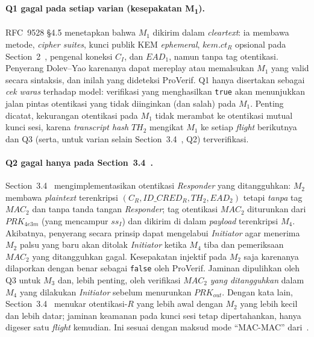 \documentclass{easychair}
\newcommand{\VarSec}[1]{Section~#1~\cite{pq-edhoc-draft}}
\begin{document}
\paragraph{Q1 gagal pada setiap varian (kesepakatan M\textsubscript{1}).}
RFC~9528 \S4.5 menetapkan bahwa $M_1$ dikirim dalam \emph{cleartext}:
ia membawa metode, \emph{cipher suites}, kunci publik KEM
\emph{ephemeral}, $\mathit{kem.ct}_R$ opsional pada \VarSec{2},
pengenal koneksi $C_I$, dan $\mathit{EAD}_1$, namun tanpa tag
otentikasi. Penyerang Dolev--Yao karenanya dapat mereplay atau
memalsukan $M_1$ yang valid secara sintaksis, dan inilah yang dideteksi
ProVerif. Q1 hanya disertakan sebagai \emph{cek waras} terhadap model:
verifikasi yang menghasilkan \texttt{true} akan menunjukkan jalan
pintas otentikasi yang tidak diinginkan (dan salah) pada $M_1$.
Penting dicatat, kekurangan otentikasi pada $M_1$ tidak merambat ke
otentikasi mutual kunci sesi, karena \emph{transcript hash} $TH_2$
mengikat $M_1$ ke setiap \emph{flight} berikutnya dan Q3 (serta,
untuk varian selain \VarSec{3.4}, Q2) terverifikasi.

\paragraph{Q2 gagal hanya pada \texorpdfstring{\VarSec{3.4}}{Section 3.4}.}
\VarSec{3.4} mengimplementasikan otentikasi \emph{Responder} yang
ditangguhkan: $M_2$ membawa \emph{plaintext} terenkripsi
$(C_R, ID\_CRED_R, TH_2, EAD_2)$ tetapi \emph{tanpa} tag
$\mathit{MAC}_2$ dan tanpa tanda tangan \emph{Responder}; tag
otentikasi $\mathit{MAC}_2$ diturunkan dari $\mathit{PRK}_{4e3m}$
(yang mencampur $\mathit{ss}_I$) dan dikirim di dalam \emph{payload}
terenkripsi $M_4$. Akibatnya, penyerang secara prinsip dapat mengelabui
\emph{Initiator} agar menerima $M_2$ palsu yang baru akan ditolak
\emph{Initiator} ketika $M_4$ tiba dan pemeriksaan $\mathit{MAC}_2$
yang ditangguhkan gagal. Kesepakatan injektif pada $M_2$ saja karenanya
dilaporkan dengan benar sebagai \texttt{false} oleh ProVerif. Jaminan
dipulihkan oleh Q3 untuk $M_3$ dan, lebih penting, oleh verifikasi
$\mathit{MAC}_2$ \emph{yang ditangguhkan} dalam $M_4$ yang dilakukan
\emph{Initiator} sebelum menurunkan $\mathit{PRK}_{out}$. Dengan kata
lain, \VarSec{3.4} menukar otentikasi-$R$ yang lebih awal dengan
$M_2$ yang lebih kecil dan lebih datar; jaminan keamanan pada kunci
sesi tetap dipertahankan, hanya digeser satu \emph{flight} kemudian.
Ini sesuai dengan maksud mode ``MAC-MAC''
dari~\cite{pq-edhoc-draft}.
\end{document}
